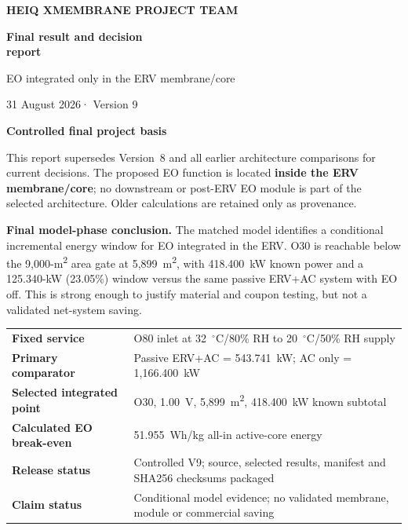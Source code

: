 \documentclass[10pt,a4paper]{article}
\newcommand{\sans}{\fontfamily{qhv}\selectfont}
\newcommand{\reportdate}{31 August 2026}
\newcommand{\reportversion}{Version 9}
\begin{document}
\thispagestyle{empty}
\vspace*{7mm}
\begin{tcolorbox}[enhanced,colback=Navy,colframe=Navy,boxrule=0pt,arc=0mm,left=12mm,right=12mm,top=12mm,bottom=12mm]
{\sans\bfseries\large\color{white}HEIQ XMEMBRANE PROJECT TEAM}\par
\vspace{8mm}
{\sans\bfseries\fontsize{28}{32}\selectfont\color{white}Final result and decision\\[-1mm]report}\par
\vspace{2mm}
{\sans\fontsize{18}{21}\selectfont\color{white}EO integrated only in the ERV membrane/core}\par
\vspace{7mm}
{\sans\large\color{white}\reportdate\quad · \quad\reportversion}
\end{tcolorbox}

\vspace{10mm}
{\sans\bfseries\Large\color{Navy}Controlled final project basis}\par
\vspace{4mm}
This report supersedes Version~8 and all earlier architecture comparisons for
current decisions. The proposed EO function is located \textbf{inside the ERV
membrane/core}; no downstream or post-ERV EO module is part of the selected
architecture. Older calculations are retained only as provenance.

\begin{mainbox}
\textbf{Final model-phase conclusion.} The matched model identifies a
conditional incremental energy window for EO integrated in the ERV. O30 is
reachable below the 9,000-m\textsuperscript{2} area gate at 5,899~m\textsuperscript{2},
with 418.400~kW known power and a 125.340-kW (23.05\%) window versus the same
passive ERV+AC system with EO off. This is strong enough to justify material
and coupon testing, but not a validated net-system saving.
\end{mainbox}

\vfill
\begin{tabularx}{\textwidth}{@{}lY@{}}
\textbf{Fixed service} & O80 inlet at 32~$^\circ$C/80\% RH to 20~$^\circ$C/50\% RH supply \\
\textbf{Primary comparator} & Passive ERV+AC = 543.741~kW; AC only = 1,166.400~kW \\
\textbf{Selected integrated point} & O30, 1.00~V, 5,899~m\textsuperscript{2}, 418.400~kW known subtotal \\
\textbf{Calculated EO break-even} & 51.955~Wh/kg all-in active-core energy \\
\textbf{Release status} & Controlled V9; source, selected results, manifest and SHA256 checksums packaged \\
\textbf{Claim status} & Conditional model evidence; no validated membrane, module or commercial saving \\
\end{tabularx}
\end{document}
